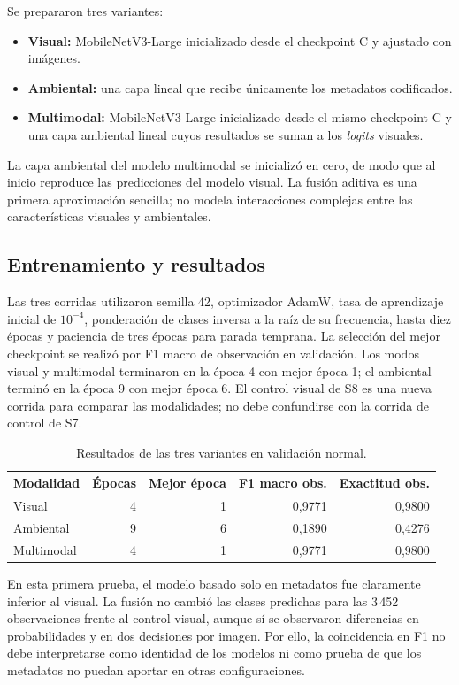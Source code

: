 \documentclass[11pt,a4paper]{article}
\begin{document}
Se prepararon tres variantes:
\begin{itemize}
\item \textbf{Visual:} MobileNetV3-Large inicializado desde el checkpoint C y
ajustado con imágenes.
\item \textbf{Ambiental:} una capa lineal que recibe únicamente los metadatos
codificados.
\item \textbf{Multimodal:} MobileNetV3-Large inicializado desde el mismo
checkpoint C y una capa ambiental lineal cuyos resultados se suman a los
\emph{logits} visuales.
\end{itemize}

La capa ambiental del modelo multimodal se inicializó en cero, de modo que al
inicio reproduce las predicciones del modelo visual. La fusión aditiva es una
primera aproximación sencilla; no modela interacciones complejas entre las
características visuales y ambientales.

\subsection{Entrenamiento y resultados}
Las tres corridas utilizaron semilla 42, optimizador AdamW, tasa de aprendizaje
inicial de $10^{-4}$, ponderación de clases inversa a la raíz de su frecuencia,
hasta diez épocas y paciencia de tres épocas para parada temprana. La selección
del mejor checkpoint se realizó por F1 macro de observación en validación.
Los modos visual y multimodal terminaron en la época 4 con mejor época 1; el
ambiental terminó en la época 9 con mejor época 6.
El control visual de S8 es una nueva corrida para comparar las modalidades;
no debe confundirse con la corrida de control de S7.

\begin{table}[H]
\centering
\caption{Resultados de las tres variantes en validación normal.}
\label{tab:s8}
\begin{tabular}{lrrrr}
\toprule
Modalidad & Épocas & Mejor época & F1 macro obs. & Exactitud obs. \\
\midrule
Visual & 4 & 1 & 0,9771 & 0,9800 \\
Ambiental & 9 & 6 & 0,1890 & 0,4276 \\
Multimodal & 4 & 1 & 0,9771 & 0,9800 \\
\bottomrule
\end{tabular}
\end{table}

En esta primera prueba, el modelo basado solo en metadatos fue claramente
inferior al visual. La fusión no cambió las clases predichas para las
3\,452 observaciones frente al control visual, aunque sí se observaron
diferencias en probabilidades y en dos decisiones por imagen. Por ello,
la coincidencia en F1 no debe interpretarse como identidad de los modelos ni
como prueba de que los metadatos no puedan aportar en otras configuraciones.
\end{document}
